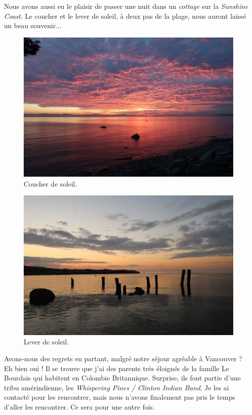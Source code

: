 Nous avons aussi eu le plaisir de passer une nuit dans un \emph{cottage}
sur la \emph{Sunshine Coast}. Le coucher et le lever de soleil, à deux
pas de la plage, nous auront laissé un beau souvenir...

\begin{figure}
\centering
\includegraphics{images/20181016_coucher.JPG}
\caption{Coucher de soleil.}
\end{figure}

\begin{figure}
\centering
\includegraphics{images/20181016_lever.JPG}
\caption{Lever de soleil.}
\end{figure}

Avons-nous des regrets en partant, malgré notre séjour agréable à
Vancouver ? Eh bien oui ! Il se trouve que j'ai des parents très
éloignés de la famille Le Bourdais qui habitent en Colombie Britannique.
Surprise, ils font partie d'une tribu amérindienne, les \emph{Whispering
Pines / Clinton Indian Band}. Je les ai contacté pour les rencontrer,
mais nous n'avons finalement pas pris le temps d'aller les rencontrer.
Ce sera pour une autre fois.

